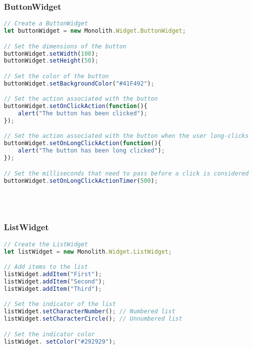 \subsubsection{ButtonWidget}
\begin{lstlisting}[language=JavaScript]
// Create a ButtonWidget
let buttonWidget = new Monolith.Widget.ButtonWidget;

// Set the dimensions of the button
buttonWidget.setWidth(100);
buttonWidget.setHeight(50);

// Set the color of the button
buttonWidget.setBackgroundColor("#41F492");

// Set the action associated with the button
buttonWidget.setOnClickAction(function(){
    alert("The button has been clicked");
});

// Set the action associated with the button when the user long-clicks it
buttonWidget.setOnLongClickAction(function(){
    alert("The button has been long clicked");
});

// Set the milliseconds that need to pass before a click is considered a long click
buttonWidget.setOnLongClickActionTimer(500);
\end{lstlisting}
~\\~\\

\subsubsection{ListWidget}
\begin{lstlisting}[language=JavaScript]
// Create the ListWidget
let listWidget = new Monolith.Widget.ListWidget;

// Add items to the list
listWidget.addItem("First");
listWidget.addItem("Second");
listWidget.addItem("Third");

// Set the indicator of the list
listWidget.setCharacterNumber(); // Numbered list
listWidget.setCharacterCircle(); // Unnumbered list

// Set the indicator color
listWidget. setColor("#292929");
\end{lstlisting}

\newpage
